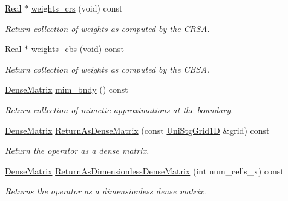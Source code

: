 \begin{DoxyCompactItemize}
\hyperlink{group__c01-roots_gac080bbbf5cbb5502c9f00405f894857d}{Real} $\ast$ \hyperlink{classmtk_1_1Div1D_ab5c791285e7e51a85b8c62a1b0ab9126}{weights\+\_\+crs} (void) const 
\begin{DoxyCompactList}\small\item\em Return collection of weights as computed by the C\+R\+S\+A. \end{DoxyCompactList}\item 
\hyperlink{group__c01-roots_gac080bbbf5cbb5502c9f00405f894857d}{Real} $\ast$ \hyperlink{classmtk_1_1Div1D_a5d4fe8c61ce41cb1134a3f9cb16deb59}{weights\+\_\+cbs} (void) const 
\begin{DoxyCompactList}\small\item\em Return collection of weights as computed by the C\+B\+S\+A. \end{DoxyCompactList}\item 
\hyperlink{classmtk_1_1DenseMatrix}{Dense\+Matrix} \hyperlink{classmtk_1_1Div1D_a2c844ef39825e73e4024d35fcdd42b12}{mim\+\_\+bndy} () const 
\begin{DoxyCompactList}\small\item\em Return collection of mimetic approximations at the boundary. \end{DoxyCompactList}\item 
\hyperlink{classmtk_1_1DenseMatrix}{Dense\+Matrix} \hyperlink{classmtk_1_1Div1D_a213fddbaaf86e4840c6a9649b69c2d49}{Return\+As\+Dense\+Matrix} (const \hyperlink{classmtk_1_1UniStgGrid1D}{Uni\+Stg\+Grid1\+D} \&grid) const 
\begin{DoxyCompactList}\small\item\em Return the operator as a dense matrix. \end{DoxyCompactList}\item 
\hyperlink{classmtk_1_1DenseMatrix}{Dense\+Matrix} \hyperlink{classmtk_1_1Div1D_af2546ad1568ef39a6075f03bb395719e}{Return\+As\+Dimensionless\+Dense\+Matrix} (int num\+\_\+cells\+\_\+x) const 
\begin{DoxyCompactList}\small\item\em Returns the operator as a dimensionless dense matrix. \end{DoxyCompactList}\end{DoxyCompactItemize}
